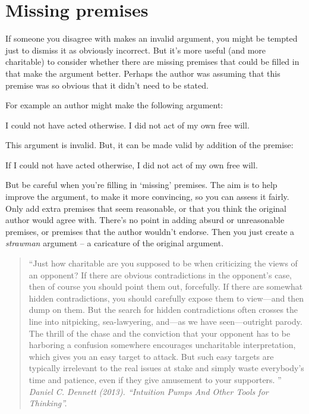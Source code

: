 \section{Missing premises}


If someone you disagree with makes an invalid
argument, you might be tempted just to dismiss it as
obviously incorrect.
But it’s more useful (and more charitable) to consider
whether there are missing premises that could be filled
in that make the argument better.
Perhaps the author was assuming that this
premise was so obvious that it didn’t need to be stated.

For example an author might make the following argument:
\begin{earg}
\prem I could not have acted otherwise.
\conc I did not act of my own free will. 
\end{earg}
This argument is invalid. But, it can be made valid by addition of the premise:
\begin{earg}
\prem If I could not have acted otherwise, I did not act of my own free will. 
\end{earg}

But be careful when you’re filling in ‘missing’ premises.
The aim is to help improve the argument, to make it
more convincing, so you can assess it fairly.
Only add extra premises that seem reasonable, or that you think
the original author would agree with.
There’s no point in adding absurd or unreasonable
premises, or premises that the author wouldn’t
endorse. Then you just create a \emph{strawman} argument –
a caricature of the original argument.


\begin{quotation}
“Just how charitable are you supposed to be when criticizing the views of an opponent? If there are obvious contradictions in the opponent’s case, then of course you should point them out, forcefully. If there are somewhat hidden contradictions, you should carefully expose them to view—and then dump on them. But the search for hidden contradictions often crosses the line into nitpicking, sea-lawyering, and—as we have seen—outright parody. The thrill of the chase and the conviction that your opponent has to be harboring a confusion somewhere encourages uncharitable interpretation, which gives you an easy target to attack. But such easy targets are typically irrelevant to the real issues at stake and simply waste everybody’s time and patience, even if they give amusement to your supporters. ”\\
\emph{Daniel C. Dennett (2013). “Intuition Pumps And Other Tools for Thinking”. }
\end{quotation}


